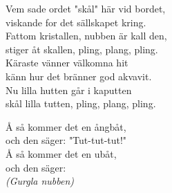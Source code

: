 \documentclass[a6paper,10pt]{article}
\begin{document}
\newpage
\setlength{\oddsidemargin}{-0.37in}
\noindent
\begin{center}
\end{center}
\begin{lyrics}
Vem sade ordet "skål" här vid bordet,\\
viskande for det sällskapet kring.\\
Fattom kristallen, nubben är kall den,\\
stiger åt skallen, pling, plang, pling.\\
Käraste vänner välkomna hit\\
känn hur det bränner god akvavit.\\
Nu lilla hutten går i kaputten\\
skål lilla tutten, pling, plang, pling.
\end{lyrics}
\vspace{60pt}
\begin{center}
\end{center}
\begin{lyrics}
Å så kommer det en ångbåt, \\
och den säger: "Tut-tut-tut!" \\
Å så kommer det en ubåt, \\
och den säger: \\
\textit{(Gurgla nubben) }
\end{lyrics}
\end{document}
